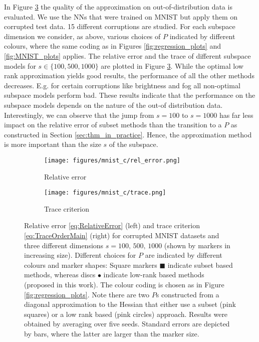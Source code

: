 In Figure \ref{fig:mnist_c} the quality of the approximation on out-of-distribution data is evaluated. We use the NNs that were trained on MNIST but apply them on corrupted test data. 15 different corruptions are studied. For each subspace dimension we consider, as above, various choices of $P$ indicated by different colours, where the same coding as in Figures \ref{fig:regression_plots} and \ref{fig:MNIST_plots} applies. The relative error and the trace of different subspace models for $s \in \{100,500, 1000\}$ are plotted in Figure \ref{fig:mnist_c}. While the optimal low rank approximation yields good results, the performance of all the other methods decreases. E.g. for certain corruptions like brightness and fog all non-optimal subspace models perform bad. These results indicate that the performance on the subspace models depends on the nature of the out-of distribution data. Interestingly, we can observe that the jump from $s=100$ to $s=1000$ has far less impact on the relative error of subset methods than the transition to a $P$ as constructed in Section \ref{sec:thm_in_practice}. Hence, the approximation method is more important than the size $s$ of the subspace.

\begin{figure}[t!] 
    \centering
    \begin{subfigure}{0.23\textwidth}  
        \centering
        \texttt{[image: figures/mnist\_c/rel\_error.png]}
        \caption{Relative error}
        \label{fig:mnist_c_rel_error}
    \end{subfigure} \hfill 
    \begin{subfigure}{0.23\textwidth}  
        \centering
        \texttt{[image: figures/mnist\_c/trace.png]}
        \caption{Trace criterion}
        \label{fig:mnist_c_trace}
    \end{subfigure}
    \caption{Relative error \eqref{eq:RelativeError} (left) and trace criterion \eqref{eq:TraceOrderMain} (right) for corrupted MNIST datasets \cite{Mu2019mnistc}  and three different dimensions $s=100,\, 500,\, 1000$ (shown by markers in increasing size). Different choices for $P$ are indicated by different colours and marker shapes: Square markers $\blacksquare$ indicate subset based methods, whereas discs $\bullet$ indicate low-rank based methods (proposed in this work). The colour coding is chosen as in Figure \ref{fig:regression_plots}. Note there are two $P$s constructed from a diagonal approximation to the Hessian that either use a subset (pink squares) or a low rank based (pink circles) approach. Results were obtained by averaging over five seeds. Standard errors are depicted by bars, where the latter are larger than the marker size.}
    \label{fig:mnist_c}
\end{figure}

